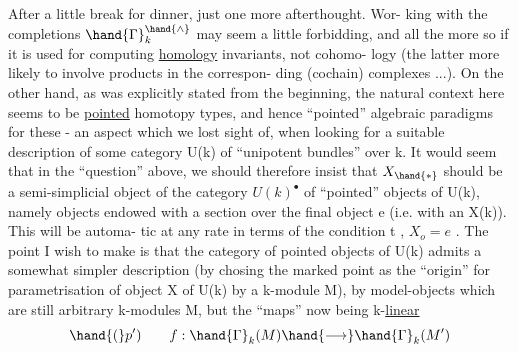 After a little break for dinner, just one more afterthought. Wor-%
king with the completions $\hand{\Gamma}_k^{\hand{\wedge}}$ may seem a little forbidding, and all
the more so if it is used for computing \uline{homology} invariants, not cohomo-%
logy (the latter more likely to involve  products in  the correspon-%
ding (cochain) complexes ...). On the other hand, as was explicitly
stated from the beginning, the natural context here seems to be
\uline{pointed} homotopy types, and hence ``pointed'' algebraic paradigms for
these - an aspect which we lost sight of, when looking for a suitable
description of some category U(k) of ``unipotent bundles'' over k. It
would seem that in the ``question'' above, we should therefore insist
that $X_{\hand{\ast}}$ should be a semi-simplicial object of the category $U(k)^{\bullet}$ of
``pointed'' objects of U(k), namely objects  endowed with a section over
the final object e (i.e. with an   X(k)). This will be automa-%
tic at any rate in terms of the condition \hand{(}t\hand{)} , $X_o = e$ . The point I
wish to make is that the category of pointed objects of U(k) admits a
somewhat simpler description (by chosing the marked point as the ``origin''
for  parametrisation of   object X of U(k) by a k-module M),
by model-objects which are still arbitrary k-modules M, but the ``maps''
now being k-\uline{linear}  
\[ \hand{(}p') \qquad f : \hand{\Gamma}_k(M) \hand{\longrightarrow} \hand{\Gamma}_k(M') \]


